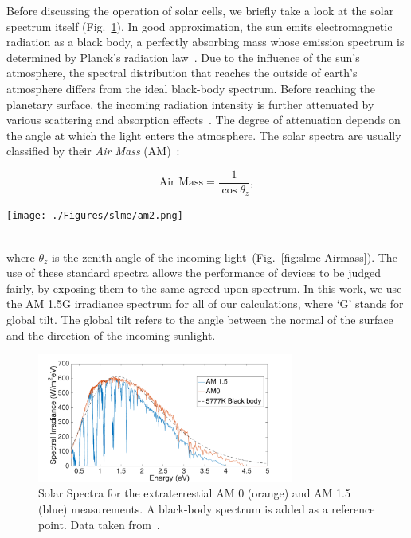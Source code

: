 \begin{refsection}
Before discussing the operation of solar cells, we briefly take a look at the 
solar spectrum itself (Fig.~\ref{fig:slme-solar}). In good approximation, the 
sun emits electromagnetic radiation as a black body, a perfectly absorbing 
mass whose emission spectrum is determined by Planck's radiation 
law~\cite{Planck1901}. Due to the influence of the sun's atmosphere, the 
spectral distribution that reaches the outside of earth's atmosphere differs 
from the ideal black-body spectrum. Before reaching the planetary surface, the 
incoming radiation intensity is further attenuated by various scattering and 
absorption effects~\cite{Bird1986}. The degree of attenuation depends on the 
angle at which the light enters the atmosphere. The solar spectra are usually 
classified by their \textit{Air Mass} (AM)~\cite{Green1981}: 
\begin{minipage}{1\textwidth} 
\begin{minipage}{0.4\textwidth} 
\begin{equation} 
\text{Air Mass} = \frac{1}{\cos \theta_z}, 
\end{equation} 
\end{minipage} 
\begin{minipage}{0.6\textwidth} 
\centering 
\texttt{[image: ./Figures/slme/am2.png]} 
\end{minipage} 
\end{minipage} 
\vspace{0.2in}\\ 
where $\theta_z$ is the zenith angle of the incoming 
light~(Fig.~\ref{fig:slme-Airmass}). The use of these standard spectra allows 
the performance of devices to be judged fairly, by exposing them to the same 
agreed-upon spectrum. In this work, we use the AM 1.5G irradiance spectrum for 
all of our calculations, where `G' stands for global tilt. The global tilt 
refers to the angle between the normal of the surface and the direction of the 
incoming sunlight. 
 
\begin{figure}[!htp]  
\centering 
\includegraphics[width=0.75\textwidth]{./Figures/slme/SolarSpectrum.png} 
\caption{\label{fig:slme-solar} Solar Spectra for the extraterrestial AM 0 
(orange) and AM 1.5 (blue) measurements. A black-body spectrum is added as a 
reference point. Data taken from~\cite{International2012}.} 
\end{figure} 
 

\end{refsection}
